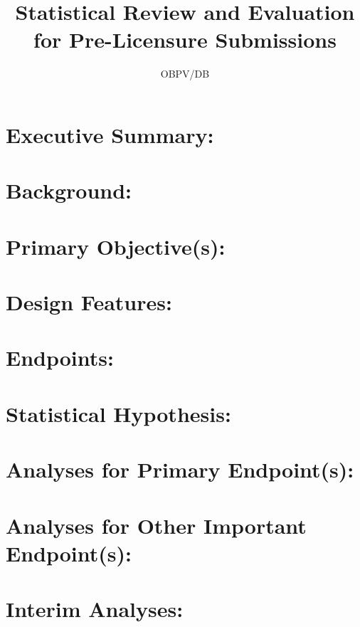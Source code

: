 \documentclass{article}
\title{Statistical Review and Evaluation for Pre-Licensure Submissions}
\author{OBPV/DB}
\begin{document}
\maketitle


\section{Executive Summary:}


\section{Background:}


\section{Primary Objective(s): }


\section{Design Features: }


\section{Endpoints: }


\section{Statistical Hypothesis: }


\section{Analyses for Primary Endpoint(s): }


\section{Analyses for Other Important Endpoint(s): }


\section{Interim Analyses: }

\end{document}
